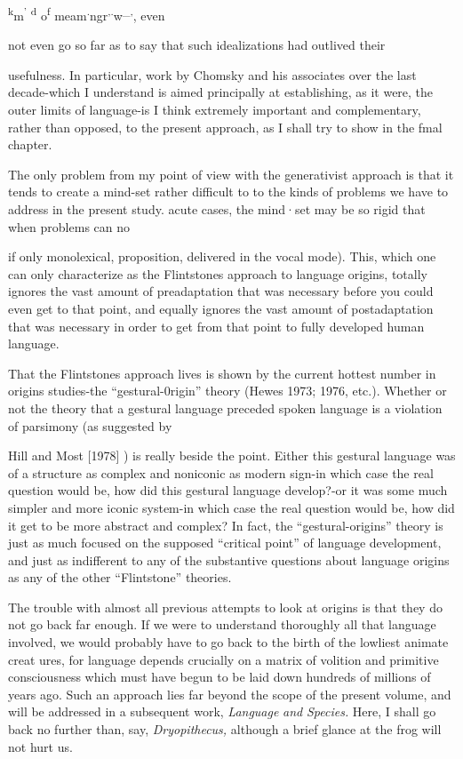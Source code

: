 \textsuperscript{k}m\textsuperscript{'} \textsuperscript{d} o\textsuperscript{f} meam\textsuperscript{.}ngr\textsuperscript{,}\textsuperscript{.}w\textsuperscript{\_}\textsuperscript{,}, even

not even go so far as to say that such idealizations had outlived their

usefulness. In particular, work by Chomsky and his associates over the last decade-which I understand is aimed principally at establishing, as it were, the outer limits of language-is I think extremely important and complementary, rather than opposed, to the present approach, as I shall try to show in the fmal chapter.

The only problem from my point of view with the generativist approach is that it tends to create a mind-set rather difficult to
to the kinds of problems we have to address in the present study. acute cases, the mind·set may be so rigid that when problems can no


if only monolexical, proposition, delivered in the vocal mode). This, which one can only characterize as the Flintstones approach to lan\-guage origins, totally ignores the vast amount of preadaptation that was necessary before you could even get to that point, and equally ignores the vast amount of postadaptation that was necessary in order to get from that point to fully developed human language.

That the Flintstones approach lives is shown by the current hottest number in origins studies-the ``gestural-0rigin'' theory (Hewes 1973; 1976, etc.). Whether or not the theory that a gestural language preceded spoken language is a violation of parsimony (as suggested by


Hill and Most [1978] ) is really beside the point. Either this gestural language was of a structure as complex and noniconic as modern sign-in which case the real question would be, how did this gestural language develop?-or it was some much simpler and more iconic system-in which case the real question would be, how did it get to be more abstract and complex? In fact, the ``gestural-origins'' theory is just as much focused on the supposed ``critical point'' of language development, and just as indifferent to any of the substantive questions about language origins as any of the other ``Flintstone'' theories.

The trouble with almost all previous attempts to look at origins is that they do not go back far enough. If we were to understand thoroughly all that language involved, we would probably have to go back to the birth of the lowliest animate creat ures, for language depends crucially on a matrix of volition and primitive consciousness which must have begun to be laid down hundreds of millions of years ago. Such an approach lies far beyond the scope of the present volume, and will be addressed in a subsequent work, \textit{Language} \textit{and} \textit{Species.} Here, I shall go back no further than, say, \textit{Dryopithecus,} although a brief glance at the frog will not hurt us.

